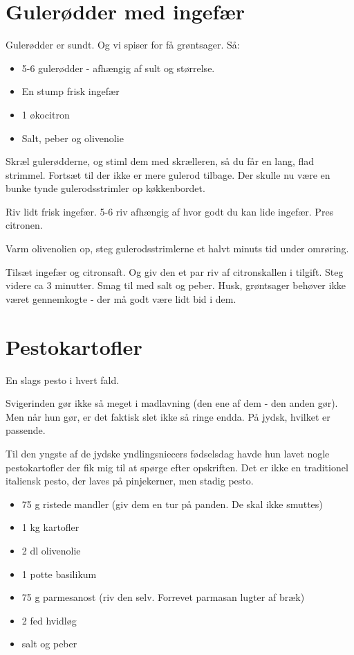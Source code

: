 \documentclass[
  letterpaper,
  DIV=11,
  numbers=noendperiod]{scrreprt}
\providecommand{\tightlist}{%
  \setlength{\itemsep}{0pt}\setlength{\parskip}{0pt}}\usepackage{longtable,booktabs,array}
\begin{document}
\hypertarget{guleruxf8dder-med-ingefuxe6r}{%
\section{Gulerødder med ingefær}\label{guleruxf8dder-med-ingefuxe6r}}

Gulerødder er sundt. Og vi spiser for få grøntsager. Så:

\begin{itemize}
\tightlist
\item
  5-6 gulerødder - afhængig af sult og størrelse.
\item
  En stump frisk ingefær
\item
  1 økocitron
\item
  Salt, peber og olivenolie
\end{itemize}

Skræl gulerødderne, og stiml dem med skrælleren, så du får en lang, flad
strimmel. Fortsæt til der ikke er mere gulerod tilbage. Der skulle nu
være en bunke tynde gulerodsstrimler op køkkenbordet.

Riv lidt frisk ingefær. 5-6 riv afhængig af hvor godt du kan lide
ingefær. Pres citronen.

Varm olivenolien op, steg gulerodsstrimlerne et halvt minuts tid under
omrøring.

Tilsæt ingefær og citronsaft. Og giv den et par riv af citronskallen i
tilgift. Steg videre ca 3 minutter. Smag til med salt og peber. Husk,
grøntsager behøver ikke været gennemkogte - der må godt være lidt bid i
dem.

\hypertarget{pestokartofler}{%
\section{Pestokartofler}\label{pestokartofler}}

En slags pesto i hvert fald.

Svigerinden gør ikke så meget i madlavning (den ene af dem - den anden
gør). Men når hun gør, er det faktisk slet ikke så ringe endda. På
jydsk, hvilket er passende.

Til den yngste af de jydske yndlingsniecers fødselsdag havde hun lavet
nogle pestokartofler der fik mig til at spørge efter opskriften. Det er
ikke en traditionel italiensk pesto, der laves på pinjekerner, men
stadig pesto.

\begin{itemize}
\tightlist
\item
  75 g ristede mandler (giv dem en tur på panden. De skal ikke smuttes)
\item
  1 kg kartofler
\item
  2 dl olivenolie
\item
  1 potte basilikum
\item
  75 g parmesanost (riv den selv. Forrevet parmasan lugter af bræk)
\item
  2 fed hvidløg
\item
  salt og peber
\end{itemize}
\end{document}
